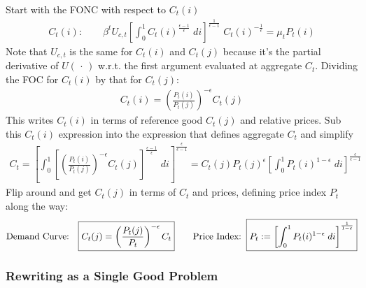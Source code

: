 \documentclass[12pt]{article}
\theoremstyle{plain}
\theoremstyle{definition}
\theoremstyle{remark}
\begin{document}
Start with the FONC with respect to $C_t(i)$
\begin{align*}
  C_t(i):\qquad
  \beta^t U_{c,t}
  \left[ \int_0^1 C_t(i)^{\frac{\epsilon-1}{\epsilon}}\;di
  \right]^{\frac{1}{\epsilon-1}}
  \; C_t(i)^{-\frac{1}{\epsilon}}
  = \mu_t P_t(i)
\end{align*}
Note that $U_{c,t}$ is the same for $C_t(i)$ and $C_t(j)$
because it's the partial derivative of $U(\,\cdot\,)$ w.r.t.  the first
argument evaluated at aggregate $C_t$. Dividing the FOC for $C_t(i)$ by
that for $C_t(j)$:
\begin{align*}
  C_t(i)
  =
  \left(
  \frac{P_t(i)}{P_t(j)}
  \right)^{-\epsilon}
  C_t(j)
\end{align*}
This writes $C_t(i)$ in terms of reference good $C_t(j)$ and relative
prices. Sub this $C_t(i)$ expression into the expression that defines
aggregate $C_t$ and simplify
\begin{align*}
  C_t
  =
  \left[
    \int_0^1
    \left[
    \left(
    \frac{P_t(i)}{P_t(j)}
    \right)^{-\epsilon}
    C_t(j)
    \right]^{\frac{\epsilon-1}{\epsilon}}
    \;di
  \right]^{\frac{\epsilon}{\epsilon-1}}
  =
  C_t(j)
  P_t(j)^\epsilon
  \left[
    \int_0^1
    P_t(i)^{1-\epsilon}
    \;di
  \right]^{\frac{\epsilon}{\epsilon-1}}
\end{align*}
Flip around and get $C_t(j)$ in terms of $C_t$ and prices, defining
price index $P_t$ along the way:
\begin{align}
  \text{Demand Curve:}\quad
  \boxed{%
  C_t(j)
  =
  \left( \frac{P_t(j)}{P_t} \right)^{-\epsilon}
  C_t
  }
  \qquad\text{Price Index:}\;\;
  \boxed{%
  P_t :=
    \left[
      \int_0^1
      P_t(i)^{1-\epsilon}
      \;di
    \right]^{\frac{1}{1-\epsilon}}
  }
  \label{nkdemandprice}
\end{align}

\clearpage
\subsubsection{Rewriting as a Single Good Problem}
\end{document}
